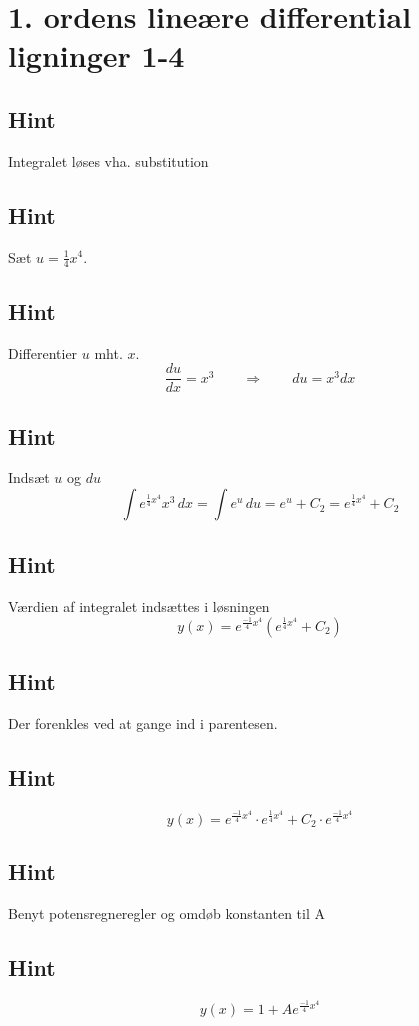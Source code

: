 \documentclass{article}
\newenvironment{exercise}[1]{\newpage\section{#1}}{}
\newcommand{\hint}{\subsection*{Hint}}
\begin{document}
\begin{exercise}{1. ordens lineære differential ligninger 1-4}
	\hint
	
	Integralet løses vha. substitution
	
	
	\hint
	Sæt $u = \frac{1}{4}x^4$.
	
	\hint
	
	Differentier $u$ mht. $x$.
	\[
	\frac{du}{dx} = x^3 \qquad	\Rightarrow \qquad du = x^3 dx
	\]
	
	\hint 
	Indsæt $u$ og $du$
	\[
	\int e^{\frac{1}{4}x^4}x^3 \, dx = \int e^{u} \, du = e^{u} + C_2 = e^{\frac{1}{4}x^4} + C_2
	\]
	
	\hint
	
	Værdien af integralet indsættes i løsningen
	\[
	y(x) = e^{\frac{-1}{4}x^4} \left( e^{\frac{1}{4}x^4}+ C_2\right)
	\]
	
	\hint
	
	Der forenkles ved at gange ind i parentesen.
	
	\hint
	\[
	y(x) = e^{\frac{-1}{4}x^4} \cdot e^{\frac{1}{4}x^4} + C_2 \cdot e^{\frac{-1}{4}x^4} 
	\]
	
	\hint
	
	Benyt potensregneregler og omdøb konstanten til A
	
	\hint
	\[
	y(x) = 1 + A e^{\frac{-1}{4}x^4}
	\]
	
	
\end{exercise}

\newpage
\end{document}

